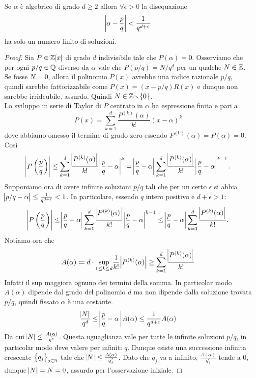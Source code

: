 \begin{thm}[Liouville]
    Se $ \alpha $ è algebrico di grado $ d \geq 2 $ allora $ \forall \epsilon > 0 $ la disequazione
    \[
        \abs{\alpha - \frac{p}{q}} < \frac{1}{q^{d + \varepsilon}}
    \]
    ha solo un numero finito di soluzioni.
\end{thm}

\begin{proof}
    Sia $ P \in \mathbb{Z}[x] $ di grado $ d $ indivisibile tale che $ P(\alpha) = 0 $. Osserviamo che per ogni $ p/q \in \mathbb{Q} $ diverso da $ \alpha $ vale che $ P(p/q) = N/q^d $ per un qualche $ N \in \mathbb{Z}$. Se fosse $N=0$, allora il polinomio $P(x)$ avrebbe una radice razionale $p/q$, quindi sarebbe fattorizzabile come $P(x)=(x-p/q)R(x)$ e dunque non sarebbe irridcubile, assurdo. Quindi $N\in \mathbb{Z} \!\smallsetminus\! \{0\} $.\\
    Lo sviluppo in serie di Taylor di $ P $ centrato in $ \alpha $ ha espressione finita e pari a
    \[
        P(x) = \sum_{k = 1}^{d} \frac{P^{(k)}(\alpha)}{k!} (x - \alpha)^k
    \]
    dove abbiamo omesso il termine di grado zero essendo $ P^{(0)}(\alpha) = P(\alpha) = 0 $. Così
    \[
        \abs{P\left(\frac{p}{q}\right)} \leq \sum_{k = 1}^{d} \frac{\abs{P^{(k)}(\alpha)}}{k!} \abs{\frac{p}{q} - \alpha}^k = \abs{\frac{p}{q} - \alpha} \sum_{k = 1}^{d} \frac{\abs{P^{(k)}(\alpha)}}{k!} \abs{\frac{p}{q} - \alpha}^{k - 1}.
    \]
    Supponiamo ora di avere infinite soluzioni $p/q$ tali che per un certo $\epsilon$ si abbia $ \abs{p/q - \alpha} \leq \frac{1}{q^{d + \varepsilon}}<1$. In particolare, essendo $q$ intero positivo e $d+\epsilon >1$:
    \[
        \abs{P\left(\frac{p}{q}\right)}\leq \abs{\frac{p}{q} - \alpha} \sum_{k = 1}^{d} \frac{\abs{P^{(k)}(\alpha)}}{k!} \abs{\frac{p}{q} - \alpha}^{k - 1} \leq \abs{\frac{p}{q} - \alpha} \sum_{k = 1}^{d} \frac{\abs{P^{(k)}(\alpha)}}{k!}.
    \]
    Notiamo ora che
    \[
        A(\alpha) \coloneqq d \cdot \underset{1 \leq k \leq d}{\sup} \dfrac{1}{k!} \abs{P^{(k)}(\alpha)} \geq  \sum\limits_{k = 1}^{d} \frac{\abs{P^{(k)}(\alpha)}}{k!}
    \]
    Infatti il sup maggiora ognuno dei termini della somma. In particolar modo $A(\alpha)$ dipende dal grado del polinomio $d$ ma non dipende dalla soluzione trovata $p/q$, quindi fissato $\alpha$ è una costante.
    \[
        \frac{\abs{N}}{q^d} \leq \abs{\frac{p}{q} - \alpha} A(\alpha) \leq \frac{1}{q^{d+\varepsilon}} A(\alpha)
    \]
    Da cui $\abs{N} \leq \frac{A(\alpha)}{q^{\varepsilon}}$. Questa uguaglianza vale per tutte le infinite soluzioni $p/q$, in particolar modo deve valere per infiniti $q$. Dunque esiste una successione infinita crescente $\left\{q_j\right\}_{j\in \mathbb{N}}$ tale che $\abs{N} \leq \frac{A(\alpha)}{q_j^{\varepsilon}}$. Dato che $q_j$ va a infinito, $\frac{A(\alpha)}{q_j^{\epsilon}}$ tende a 0, dunque $\abs{N}=N=0$, assurdo per l'osservazione iniziale.\qedhere
\end{proof}


